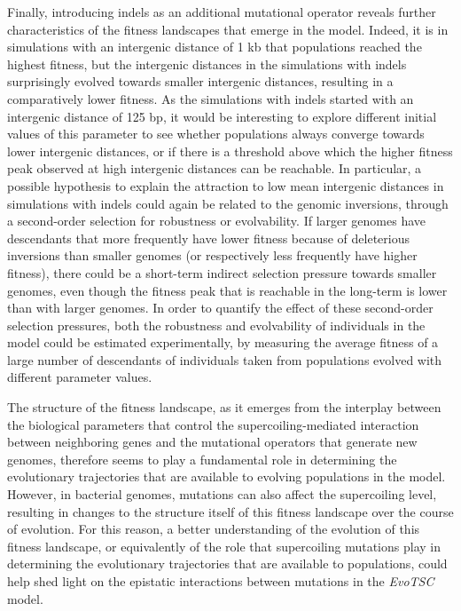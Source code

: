 Finally, introducing indels as an additional mutational operator reveals further characteristics of the fitness landscapes that emerge in the model.
Indeed, it is in simulations with an intergenic distance of 1 kb that populations reached the highest fitness, but the intergenic distances in the simulations with indels surprisingly evolved towards smaller intergenic distances, resulting in a comparatively lower fitness.
As the simulations with indels started with an intergenic distance of 125 bp, it would be interesting to explore different initial values of this parameter to see whether populations always converge towards lower intergenic distances, or if there is a threshold above which the higher fitness peak observed at high intergenic distances can be reachable.
In particular, a possible hypothesis to explain the attraction to low mean intergenic distances in simulations with indels could again be related to the genomic inversions, through a second-order selection for robustness or evolvability.
If larger genomes have descendants that more frequently have lower fitness because of deleterious inversions than smaller genomes (or respectively less frequently have higher fitness), there could be a short-term indirect selection pressure towards smaller genomes, even though the fitness peak that is reachable in the long-term is lower than with larger genomes.
In order to quantify the effect of these second-order selection pressures, both the robustness and evolvability of individuals in the model could be estimated experimentally, by measuring the average fitness of a large number of descendants of individuals taken from populations evolved with different parameter values.

The structure of the fitness landscape, as it emerges from the interplay between the biological parameters that control the supercoiling-mediated interaction between neighboring genes and the mutational operators that generate new genomes, therefore seems to play a fundamental role in determining the evolutionary trajectories that are available to evolving populations in the model.
However, in bacterial genomes, mutations can also affect the supercoiling level, resulting in changes to the structure itself of this fitness landscape over the course of evolution.
For this reason, a better understanding of the evolution of this fitness landscape, or equivalently of the role that supercoiling mutations play in determining the evolutionary trajectories that are available to populations, could help shed light on the epistatic interactions between mutations in the \emph{EvoTSC} model.
